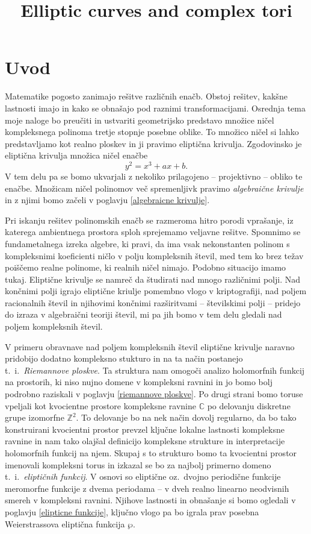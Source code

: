 \documentclass[mat1]{fmfdelo}
\title{Elliptic curves and complex tori}
\numberwithin{equation}{section}
\newcommand{\Z}{\mathbb Z}
\newcommand{\C}{\mathbb C}
\newcommand{\ti}{t.~i.\ }
\newcommand{\oz}{oz.\ }
\theoremstyle{definition}
\begin{document}


\section{Uvod}

Matematike pogosto zanimajo rešitve različnih enačb. Obstoj rešitev, kakšne lastnosti imajo in
kako se obnašajo pod raznimi transformacijami. Osrednja tema moje naloge bo preučiti in ustvariti
geometrijsko predstavo množice ničel kompleksnega polinoma tretje stopnje posebne oblike. 
To množico ničel si lahko predstavljamo kot realno ploskev in ji pravimo eliptična krivulja.   
Zgodovinsko je eliptična krivulja množica ničel enačbe
\[
    y^2 = x^3 + ax + b. 
\]
V tem delu pa se bomo ukvarjali z nekoliko prilagojeno -- projektivno -- obliko te enačbe. Množicam ničel
polinomov več spremenljivk pravimo \emph{algebraične krivulje} in z njimi bomo začeli v poglavju \ref{algebraicne krivulje}. 
\par 
Pri iskanju rešitev
polinomskih enačb se razmeroma hitro porodi vprašanje, iz katerega ambientnega prostora 
sploh sprejemamo veljavne rešitve. Spomnimo se fundametalnega izreka algebre, ki pravi, da ima
vsak nekonstanten polinom s kompleksnimi koeficienti ničlo v polju kompleksnih števil, med tem
ko brez težav poiščemo realne polinome, ki realnih ničel nimajo. Podobno situacijo imamo tukaj. 
Eliptične krivulje se namreč da študirati nad mnogo različnimi polji. Nad končnimi polji igrajo
eliptične kriulje pomembno vlogo v kriptografiji, nad poljem racionalnih števil in njihovimi končnimi razširitvami -- številskimi polji -- pridejo do izraza v algebraični teoriji
števil, mi pa jih bomo v tem delu gledali nad poljem kompleksnih števil. 
\par
V primeru obravnave nad poljem kompleksnih števil eliptične
krivulje naravno pridobijo dodatno kompleksno stukturo in na ta način postanejo \ti \emph{Riemannove ploskve}. Ta struktura nam omogoči analizo holomorfnih funkcij na prostorih, ki niso nujno domene v kompleksni ravnini in jo
bomo bolj podrobno raziskali v poglavju \ref{riemannove ploskve}.
Po drugi strani bomo toruse vpeljali kot kvocientne prostore kompleksne ravnine $\C$ po delovanju diskretne grupe izomorfne $\Z^2$. To delovanje bo na nek način dovolj regularno, da bo tako konstruirani kvocientni prostor prevzel ključne lokalne lastnosti kompleksne ravnine in nam tako olajšal definicijo kompleksne strukture in interpretacije holomorfnih funkcij na njem. Skupaj s to strukturo bomo ta kvocientni prostor imenovali kompleksni torus in izkazal se bo za najbolj primerno domeno \ti \emph{eliptičnih funkcij}. V osnovi so eliptične \oz dvojno periodične funkcije meromorfne funkcije z dvema periodama -- v dveh realno linearno neodvisnih smereh v kompleksni ravnini. Njihove lastnosti in obnašanje si bomo ogledali v poglavju \ref{elipticne funkcije}, ključno vlogo pa bo igrala prav posebna Weierstrassova eliptična funkcija $\wp$.
\end{document}

